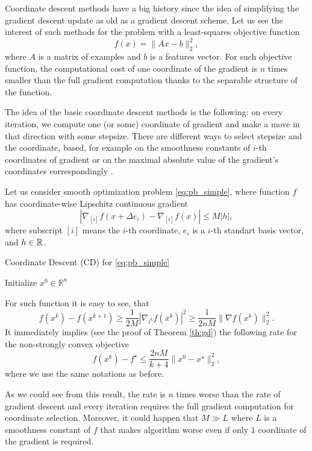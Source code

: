 Coordinate descent methods have a big history since the idea of simplifying the gradient descent update as old as a gradient descent scheme. Let us see the interest of such methods for the problem with a least-squares objective function
$$
f(x) = \|Ax-b\|_2^2,
$$
where $A$ is a matrix of examples and $b$ is a features vector. For such objective function, the computational cost of one coordinate of the gradient is $n$ times smaller than the full gradient computation thanks to the separable structure of the function.

The idea of the basic coordinate descent methods is the following: on every iteration, we compute one (or some) coordinate of gradient and make a move in that direction with some stepsize. There are different ways to select stepsize and the coordinate, based, for example on the smoothness constants of $i$-th coordinates of gradient \cite{richtarik2012efficient} or on the maximal absolute value of the gradient's coordinates correspondingly \cite{nesterov2012efficiency}. 

Let us consider smooth optimization problem \eqref{eq:pb_simple}, where function $f$ has coordinate-wise Lipschitz continuous gradient
$$
|\nabla_{[i]} f(x+\Delta e_i) - \nabla_{[i]} f(x)|\leq M|h|,
$$
where subscript $[i]$ means the $i$-th coordinate, $e_i$ is a $i$-th standart basis vector, and $h\in\mathbb{R}$.
\begin{algorithm}
    \caption{Coordinate Descent (CD) for \eqref{eq:pb_simple}}
    \label{algo:cd}
    \begin{algorithmic}
        \STATE Initialize $x^0\in\mathbb{R}^n$
        \ENDFOR
    \end{algorithmic}
\end{algorithm}
For such function it is easy to see, that
$$
f(x^{k}) - f(x^{k+1})\geq \frac{1}{2M}|\nabla_{i^k} f(x^k)|^2\geq \frac{1}{2nM}\|\nabla f(x^k)\|_2^2.
$$
It immediately implies (see the proof of Theorem \ref{th:gd}) the following rate for the non-strongly convex objective
$$
f(x^k) - f^\star\leq \frac{2nM}{k+4}\|x^0-x^\star\|_2^2,
$$
where we use the same notations as before. 

As we could see from this result, the rate is $n$ times worse than the rate of gradient descent and every iteration requires the full gradient computation for coordinate selection. Moreover, it could happen that $M\gg L$ where $L$ is a smoothness constant of $f$ that makes algorithm worse even if only $1$ coordinate of the gradient is required.


